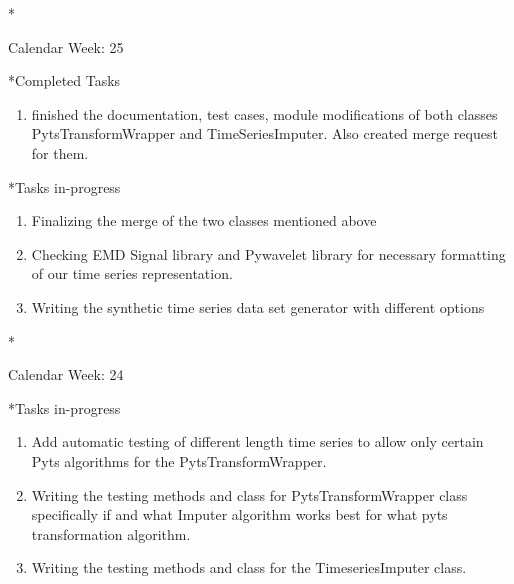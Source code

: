 \documentclass[11pt,a4paper]{article}
\begin{document}
\newpage
\begin{section}*{Calendar Week: 25 \hfill \date{25 June, 2021}}
	
	\begin{subsection}*{Completed Tasks}
		\begin{enumerate}
			\item finished the documentation, test cases, module modifications of both classes PytsTransformWrapper and TimeSeriesImputer. Also created merge request for them.
		\end{enumerate}
	\end{subsection}
	
	\begin{subsection}*{Tasks in-progress}
		\begin{enumerate}
			\item Finalizing the merge of the two classes mentioned above
			\item Checking EMD Signal library and Pywavelet library for necessary formatting of our time series representation.
			\item Writing the synthetic time series data set generator with different options
		\end{enumerate}
	\end{subsection}
	
\end{section}


\newpage
\begin{section}*{Calendar Week: 24 \hfill \date{18 June, 2021}}
	
	\begin{subsection}*{Tasks in-progress}
		\begin{enumerate}
			\item Add automatic testing of different length time series to allow only certain Pyts algorithms for the PytsTransformWrapper.
			\item Writing the testing methods and class for PytsTransformWrapper class specifically if and what Imputer algorithm works best for what pyts transformation algorithm.
			\item Writing the testing methods and class for the TimeseriesImputer class.
		\end{enumerate}
	\end{subsection}
	
\end{section}
\end{document}
